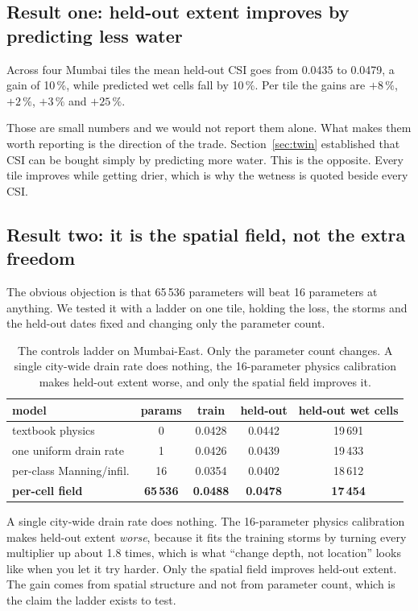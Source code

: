 \subsection{Result one: held-out extent improves by predicting less water}
Across four Mumbai tiles the mean held-out CSI goes from 0.0435 to 0.0479, a gain of 10\,\%, while
predicted wet cells fall by 10\,\%. Per tile the gains are $+8\,\%$, $+2\,\%$, $+3\,\%$ and
$+25\,\%$.

Those are small numbers and we would not report them alone. What makes them worth reporting is the
direction of the trade. Section~\ref{sec:twin} established that CSI can be bought simply by
predicting more water. This is the opposite. Every tile improves while getting drier, which is why
the wetness is quoted beside every CSI.

\subsection{Result two: it is the spatial field, not the extra freedom}
The obvious objection is that 65\,536 parameters will beat 16 parameters at anything. We tested it
with a ladder on one tile, holding the loss, the storms and the held-out dates fixed and changing
only the parameter count.

\begin{table}[!t]
\centering
\caption{The controls ladder on Mumbai-East. Only the parameter count changes. A single city-wide
drain rate does nothing, the 16-parameter physics calibration makes held-out extent worse, and only
the spatial field improves it.}
\label{tab:ladder_sink}
\begin{tabular}{lcccc}
\toprule
model & params & train & held-out & held-out wet cells \\
\midrule
textbook physics          & 0      & 0.0428 & 0.0442 & 19\,691 \\
one uniform drain rate    & 1      & 0.0426 & 0.0439 & 19\,433 \\
per-class Manning/infil.  & 16     & 0.0354 & 0.0402 & 18\,612 \\
\textbf{per-cell field}   & \textbf{65\,536} & \textbf{0.0488} & \textbf{0.0478} & \textbf{17\,454} \\
\bottomrule
\end{tabular}
\end{table}

A single city-wide drain rate does nothing. The 16-parameter physics calibration makes held-out
extent \emph{worse}, because it fits the training storms by turning every multiplier up about 1.8
times, which is what ``change depth, not location'' looks like when you let it try harder. Only the
spatial field improves held-out extent. The gain comes from spatial structure and not from
parameter count, which is the claim the ladder exists to test.

